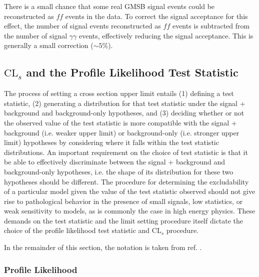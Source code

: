 \documentclass[dissertation.tex]{subfiles}
\begin{document}
\marginpar{\textcolor{blue}{Added signal contamination par.}}There is a small chance that some real GMSB signal events could be reconstructed as $\mathit{ff}$ events in the data.  To correct the signal acceptance for this effect, the number of signal events reconstructed as $\mathit{ff}$ events is subtracted from the number of signal $\gamma\gamma$ events, effectively reducing the signal acceptance.  This is generally a small correction ($\sim5$\%).

\subsection{$\mbox{CL}_{s}$ and the Profile Likelihood Test Statistic}
\label{sec:CLs and the Profile Likelihood Test Statistic}

The process of setting a cross section upper limit entails (1) defining a test statistic, (2) generating a distribution for that test statistic under the signal + background and background-only hypotheses, and (3) deciding whether or not the observed value of the test statistic is more compatible with the signal + background (i.e. weaker upper limit) or background-only (i.e. stronger upper limit) hypotheses by considering where it falls within the test statistic distributions.  An important requirement on the choice of test statistic is that it be able to effectively discriminate between the signal + background and background-only hypotheses, i.e. the shape of its distribution for these two hypotheses should be different.  The procedure for determining the excludability of a particular model given the value of the test statistic observed should not give rise to pathological behavior in the presence of small signals, low statistics, or weak sensitivity to models, as is commonly the case in high energy physics.  These demands on the test statistic and the limit setting procedure itself dictate the choice of the profile likelihood test statistic and $\mbox{CL}_{s}$ procedure.

In the remainder of this section, the notation is taken from ref. \cite{CMS-NOTE-2011/005}.

\subsubsection{Profile Likelihood}
\label{sec:Profile Likelihood}
\end{document}
